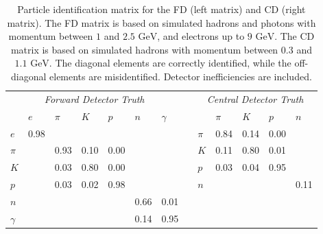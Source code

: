     \begin{table}
        \caption{Particle identification matrix for the FD (left matrix) and CD (right matrix).
        The FD matrix is based on simulated hadrons and photons with momentum between $1$ and $2.5 \text{ GeV}$, and electrons up to $9 \text{ GeV}$.
        The CD matrix is based on simulated hadrons with momentum between $0.3$ and $1.1 \text{ GeV}$.
        The diagonal elements are correctly identified, while the off-diagonal elements are misidentified.
        Detector inefficiencies are included.}

        \begin{tabularx}{\textwidth}{XXXXXXXXXXXXX}
            \multicolumn{7}{c}{\textit{Forward Detector Truth}} & & \multicolumn{5}{c}{\textit{Central Detector Truth}}  \\
            \cmidrule{1-7} \cmidrule{9-13}
                     & $e$      & $\pi$ & $K$  & $p$  & $n$  & $\gamma$ & &       & $\pi$    & $K$  & $p$  & $n$  \\
            \cmidrule{1-7} \cmidrule{9-13}
            $e$      & 0.98     &       &      &      &      &          & & $\pi$ & 0.84     & 0.14 & 0.00 &      \\
            $\pi$    &          & 0.93  & 0.10 & 0.00 &      &          & & $K$   & 0.11     & 0.80 & 0.01 &      \\
            $K$      &          & 0.03  & 0.80 & 0.00 &      &          & & $p$   & 0.03     & 0.04 & 0.95 &      \\
            $p$      &          & 0.03  & 0.02 & 0.98 &      &          & & $n$   &          &      &      & 0.11 \\
            \cmidrule{9-13}
            $n$      &          &       &      &      & 0.66 & 0.01     & &       &          &      &      &      \\
            $\gamma$ &          &       &      &      & 0.14 & 0.95     & &       &          &      &      &      \\
            \cmidrule{1-7}
        \end{tabularx}
        \label{tab::11.232::reconstruction_pid}
    \end{table}

    \pagebreak

